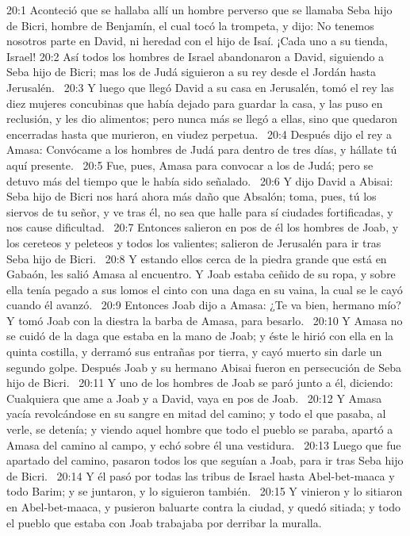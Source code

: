 20:1 Aconteció que se hallaba allí un hombre perverso que se llamaba Seba hijo de Bicri, hombre de Benjamín, el cual tocó la trompeta, y dijo: No tenemos nosotros parte en David, ni heredad con el hijo de Isaí. ¡Cada uno a su tienda, Israel! 
20:2 Así todos los hombres de Israel abandonaron a David, siguiendo a Seba hijo de Bicri; mas los de Judá siguieron a su rey desde el Jordán hasta Jerusalén.  
20:3 Y luego que llegó David a su casa en Jerusalén, tomó el rey las diez mujeres concubinas que había dejado para guardar la casa, y las puso en reclusión, y les dio alimentos; pero nunca más se llegó a ellas, sino que quedaron encerradas hasta que murieron, en viudez perpetua.  
20:4 Después dijo el rey a Amasa: Convócame a los hombres de Judá para dentro de tres días, y hállate tú aquí presente.  
20:5 Fue, pues, Amasa para convocar a los de Judá; pero se detuvo más del tiempo que le había sido señalado.  
20:6 Y dijo David a Abisai: Seba hijo de Bicri nos hará ahora más daño que Absalón; toma, pues, tú los siervos de tu señor, y ve tras él, no sea que halle para sí ciudades fortificadas, y nos cause dificultad.  
20:7 Entonces salieron en pos de él los hombres de Joab, y los cereteos y peleteos y todos los valientes; salieron de Jerusalén para ir tras Seba hijo de Bicri.  
20:8 Y estando ellos cerca de la piedra grande que está en Gabaón, les salió Amasa al encuentro. Y Joab estaba ceñido de su ropa, y sobre ella tenía pegado a sus lomos el cinto con una daga en su vaina, la cual se le cayó cuando él avanzó.  
20:9 Entonces Joab dijo a Amasa: ¿Te va bien, hermano mío? Y tomó Joab con la diestra la barba de Amasa, para besarlo.  
20:10 Y Amasa no se cuidó de la daga que estaba en la mano de Joab; y éste le hirió con ella en la quinta costilla, y derramó sus entrañas por tierra, y cayó muerto sin darle un segundo golpe. Después Joab y su hermano Abisai fueron en persecución de Seba hijo de Bicri.  
20:11 Y uno de los hombres de Joab se paró junto a él, diciendo: Cualquiera que ame a Joab y a David, vaya en pos de Joab.  
20:12 Y Amasa yacía revolcándose en su sangre en mitad del camino; y todo el que pasaba, al verle, se detenía; y viendo aquel hombre que todo el pueblo se paraba, apartó a Amasa del camino al campo, y echó sobre él una vestidura.  
20:13 Luego que fue apartado del camino, pasaron todos los que seguían a Joab, para ir tras Seba hijo de Bicri.  
20:14 Y él pasó por todas las tribus de Israel hasta Abel-bet-maaca y todo Barim; y se juntaron, y lo siguieron también.  
20:15 Y vinieron y lo sitiaron en Abel-bet-maaca, y pusieron baluarte contra la ciudad, y quedó sitiada; y todo el pueblo que estaba con Joab trabajaba por derribar la muralla.  
